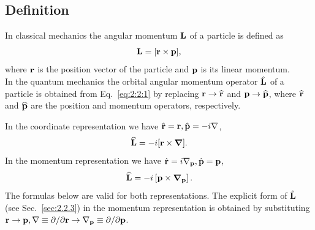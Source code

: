 \subsection{Definition}
In classical mechanics the angular momentum $\mathbf{L}$ of a particle is defined as
\begin{equation}
\mathbf{L}=[\mathbf{r} \times \mathbf{p}],\label{eq:2:2:1}
\end{equation}
where $\mathbf{r}$ is the position vector of the particle and $\mathbf{p}$ is its linear momentum.\\
In the quantum mechanics the orbital angular momentum operator $\hat{\mathbf{L}}$ of a particle is obtained from Eq.~\eqref{eq:2:2:1} by replacing $\mathbf{r} \rightarrow \widehat{\mathbf{r}}$ and $\mathbf{p} \rightarrow \widehat{\mathbf{p}}$, where $\widehat{\mathbf{r}}$ and $\widehat{\mathbf{p}}$ are the position and momentum operators, respectively.

In the coordinate representation we have $\hat{\mathbf{r}}=\mathbf{r}, \hat{\mathbf{p}}=-i \nabla$,
\begin{equation}
\widehat{\mathbf{L}}=-i[\mathbf{r} \times \boldsymbol{\nabla}] . \label{eq:2:2:2}
\end{equation}
In the momentum representation we have $\hat{\mathbf{r}}=i \mathbf{\nabla}_{\mathbf{p}}, \hat{\mathbf{p}}=\mathbf{p}$,
\begin{equation}
\widehat{\mathbf{L}}=-i\left[\mathbf{p} \times \boldsymbol{\nabla}_{\mathbf{p}}\right] . \label{eq:2:2:3}
\end{equation}
The formulas below are valid for both representations. The explicit form of $\hat{\mathbf{L}}$ (see Sec.~\ref{sec:2.2.3}) in the momentum representation is obtained by substituting $\mathbf{r} \rightarrow \mathbf{p}, \mathbf{\nabla} \equiv \partial / \partial \mathbf{r} \rightarrow \mathbf{\nabla}_{\mathbf{p}} \equiv \partial / \partial \mathbf{p}$.

